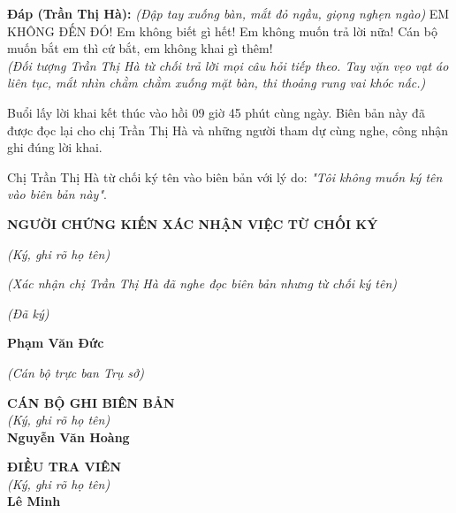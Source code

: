 \documentclass[12pt,a4paper]{article}
\begin{document}
\noindent\textbf{Đáp (Trần Thị Hà):} \textit{(Đập tay xuống bàn, mắt đỏ ngầu, giọng nghẹn ngào)} EM KHÔNG ĐẾN ĐÓ! Em không biết gì hết! Em không muốn trả lời nữa! Cán bộ muốn bắt em thì cứ bắt, em không khai gì thêm!\\[0.35cm]

\textit{(Đối tượng Trần Thị Hà từ chối trả lời mọi câu hỏi tiếp theo. Tay vặn vẹo vạt áo liên tục, mắt nhìn chằm chằm xuống mặt bàn, thi thoảng rung vai khóc nấc.)}



Buổi lấy lời khai kết thúc vào hồi 09 giờ 45 phút cùng ngày. Biên bản này đã được đọc lại cho chị Trần Thị Hà và những người tham dự cùng nghe, công nhận ghi đúng lời khai.


Chị Trần Thị Hà từ chối ký tên vào biên bản với lý do: \textit{"Tôi không muốn ký tên vào biên bản này"}.


\textbf{NGƯỜI CHỨNG KIẾN XÁC NHẬN VIỆC TỪ CHỐI KÝ}

\textit{(Ký, ghi rõ họ tên)}

\textit{(Xác nhận chị Trần Thị Hà đã nghe đọc biên bản nhưng từ chối ký tên)}



\textit{(Đã ký)}

\textbf{Phạm Văn Đức}

\textit{(Cán bộ trực ban Trụ sở)}

\vspace{0.8cm}
\noindent
\begin{minipage}[t]{0.48\textwidth}
    \begin{center}
        \textbf{CÁN BỘ GHI BIÊN BẢN}\\[0.1cm]
        \textit{(Ký, ghi rõ họ tên)}\\[1.6cm]
        \textbf{Nguyễn Văn Hoàng}
    \end{center}
\end{minipage}
\hfill
\begin{minipage}[t]{0.48\textwidth}
    \begin{center}
        \textbf{ĐIỀU TRA VIÊN}\\[0.1cm]
        \textit{(Ký, ghi rõ họ tên)}\\[1.6cm]
        \textbf{Lê Minh}
    \end{center}
\end{minipage}
\end{document}
